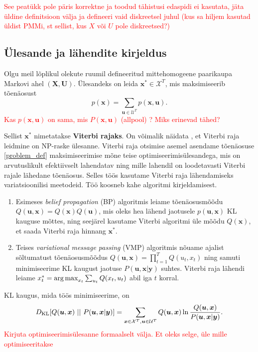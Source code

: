 \textcolor{red}{See peatükk pole päris korrektne ja toodud tähistusi edaspidi ei kasutata, jäta üldine definitsioon välja ja defineeri vaid diskreetsel juhul (kus sa hiljem kasutad üldist PMMi, st sellist, kus $X$ või $U$ pole diskreetsed?)}
\subsection{Ülesande ja lähendite kirjeldus}


Olgu meil lõplikul olekute ruumil defineeritud mittehomogeene paarikaupa Markovi ahel $(\bm{X},\bm{U})$. Ülesandeks on leida $\bm{x}^* \in \mathcal{X}^T$, mis maksimiseerib tõenäosust 
\begin{equation}\label{problem_def}
    p(\bm{x})=\sum_{\bm{u} \in \mathcal{U}^T}{p(\bm{x}, \bm{u})}.
\end{equation}
\textcolor{red}{Kas $p(\bm{x}, \bm{u})$ on sama, mis $P(\bm{x}, \bm{u})$ (allpool) ? Miks erinevad tähed?}


Sellist $\mathbf{x}^*$ nimetatakse \textbf{Viterbi rajaks}. On võimalik näidata \parencite{LYNGSO2002545}, et Viterbi raja leidmine on NP-raske ülesanne. Viterbi raja otsimise asemel asendame tõenäosuse \eqref{problem_def} maksimiseerimise mõne teise optimiseerimisülesandega, mis on arvutuslikult efektiivselt lahendatav ning mille lahendil on loodetavasti Viterbi rajale lähedane tõenäosus. Selles töös kasutame Viterbi raja lähendamiseks  variatsioonilisi meetodeid. Töö koosneb kahe algoritmi kirjeldamisest.
\begin{enumerate}
    \item Esimeses \emph{belief propagation} (BP) algoritmis leiame tõenäosusmõõdu $Q(\bm{u}, \bm{x}) = Q(\bm{x})Q(\bm{u})$, mis oleks hea lähend jaotusele $p(\bm{u},\bm{x})$ KL kauguse mõttes, ning seejärel kasutame Viterbi algoritmi üle mõõdu $Q(\bm{x})$, et saada Viterbi raja hinnang $\bm{x}^*$.
    \item Teises \emph{variational message passing} (VMP) algoritmis nõuame ajalist sõltumatust tõenäosusmõõdus $Q(\bm{u}, \bm{x}) = \prod_{t=1}^T Q(u_t,x_t)$ ning samuti minimiseerime KL kaugust jaotuse $P(\bm{u},\bm{x} | \bm{y})$ suhtes. Viterbi raja lähendi leiame $x_t^* = \operatorname*{arg\,max}_{x_t} \sum_{u_t} Q(x_t,u_t)$ abil iga $t$ korral.
\end{enumerate}

KL kaugus, mida töös minimiseerime, on
$$D_{\mathrm{KL}}[Q(\bm{u}, \bm{x}) \ ||\ P(\bm{u}, \bm{x} | \bm{y})] = \sum_{\bm{x} \in \mathcal{X}^T, \bm{u} \in \mathcal{U}^T} Q(\bm{u}, \bm{x}) \ln \frac{Q(\bm{u}, \bm{x})}{P(\bm{u}, \bm{x} | \bm{y})}.$$
\textcolor{red}{Kirjuta optimiseerimisülesanne formaalselt välja. Et oleks selge, üle mille optimiseeritakse}

